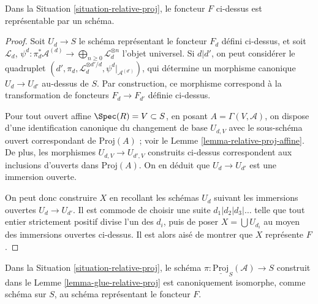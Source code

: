\begin{lemma}
\label{lemma-relative-proj}
Dans la Situation \ref{situation-relative-proj}, le foncteur $F$ ci-dessus
est représentable par un schéma.
\end{lemma}

\begin{proof}
Soit $U_d \to S$ le schéma représentant le foncteur $F_d$ défini ci-dessus,
et soit $\mathcal{L}_d$,
$\psi^d : \pi_d^*\mathcal{A}^{(d)} \to
\bigoplus_{n \geq 0} \mathcal{L}_d^{\otimes n}$ l'objet universel.
Si $d | d'$, on peut considérer le quadruplet
$(d', \pi_d, \mathcal{L}_d^{\otimes d'/d}, \psi^d|_{\mathcal{A}^{(d')}})$,
qui détermine un morphisme canonique $U_d \to U_{d'}$ au-dessus de $S$.
Par construction, ce morphisme correspond à la transformation de foncteurs
$F_d \to F_{d'}$ définie ci-dessus.

\medskip\noindent
Pour tout ouvert affine $\Spec(R) = V \subset S$, en posant
$A = \Gamma(V, \mathcal{A})$, on dispose d'une identification canonique
du changement de base $U_{d, V}$ avec le sous-schéma ouvert correspondant
de $\text{Proj}(A)$ ; voir le Lemme \ref{lemma-relative-proj-affine}.
De plus, les morphismes $U_{d, V} \to U_{d', V}$ construits ci-dessus
correspondent aux inclusions d'ouverts dans $\text{Proj}(A)$.
On en déduit que $U_d \to U_{d'}$ est une immersion ouverte.

\medskip\noindent
On peut donc construire $X$ en recollant les schémas $U_d$ suivant les
immersions ouvertes $U_d \to U_{d'}$. Il est commode de choisir une suite
$d_1 | d_2 | d_3 | \ldots$ telle que tout entier strictement positif divise
l'un des $d_i$, puis de poser $X = \bigcup U_{d_i}$ au moyen des immersions
ouvertes ci-dessus. Il est alors aisé de montrer que $X$ représente $F$.
\end{proof}

\begin{lemma}
\label{lemma-glueing-gives-functor-proj}
Dans la Situation \ref{situation-relative-proj}, le schéma
$\pi : \underline{\text{Proj}}_S(\mathcal{A}) \to S$ construit dans le
Lemme \ref{lemma-glue-relative-proj} est canoniquement isomorphe, comme
schéma sur $S$, au schéma représentant le foncteur $F$.
\end{lemma}

